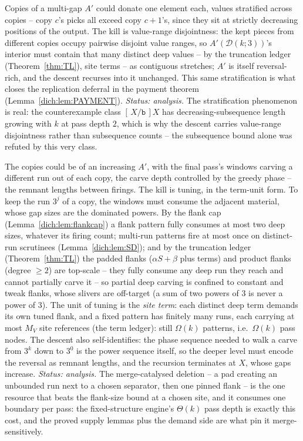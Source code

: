 \documentclass[runningheads,envcountsect]{llncs}
\begin{document}
\begin{proposition}
    \label{dich:escapeA}
    Copies of a multi-gap $A'$ could donate one element each, values stratified across copies -- copy $c$'s picks all exceed copy $c{+}1$'s, since they sit at strictly decreasing positions of the output. The kill is value-range disjointness: the kept pieces from different copies occupy pairwise disjoint value ranges, so $A'(\mathcal D(k;3))$'s interior must contain that many distinct deep values -- by the truncation ledger (Theorem~\ref{thm:TL}), site terms -- as contiguous stretches; $A'$ is itself reversal-rich, and the descent recurses into it unchanged. This same stratification is what closes the replication deferral in the payment theorem (Lemma~\ref{dich:lem:PAYMENT}). \emph{Status: analysis.} The stratification phenomenon is real: the counterexample class $[\,X/\mathtt b\,]X$ has decreasing-subsequence length growing with $k$ at pass depth $2$, which is why the descent carries value-range disjointness rather than subsequence counts -- the subsequence bound alone was refuted by this very class.
\end{proposition}

\begin{proposition}
    \label{dich:escapeB}
    The copies could be of an increasing $A'$, with the final pass's windows carving a different run out of each copy, the carve depth controlled by the greedy phase -- the remnant lengths between firings. The kill is tuning, in the term-unit form. To keep the run $3^j$ of a copy, the windows must consume the adjacent material, whose gap sizes are the dominated powers. By the flank cap (Lemma~\ref{dich:lem:flankcap}) a flank pattern fully consumes at most two deep sizes, whatever its firing count; multi-run patterns fire at most once on distinct-run scrutinees (Lemma~\ref{dich:lem:SD}); and by the truncation ledger (Theorem~\ref{thm:TL}) the padded flanks ($\alpha S + \beta$ plus terms) and product flanks (degree $\ge 2$) are top-scale -- they fully consume any deep run they reach and cannot partially carve it -- so partial deep carving is confined to constant and tweak flanks, whose slivers are off-target (a sum of two powers of $3$ is never a power of $3$). The unit of tuning is the \emph{site term}: each distinct deep term demands its own tuned flank, and a fixed pattern has finitely many runs, each carrying at most $M_V$ site references (the term ledger): still $\Omega(k)$ patterns, i.e.\ $\Omega(k)$ pass nodes. The descent also self-identifies: the phase sequence needed to walk a carve from $3^k$ down to $3^0$ is the power sequence itself, so the deeper level must encode the reversal as remnant lengths, and the recursion terminates at $X$, whose gaps increase. \emph{Status: analysis.} The merge-catalysed deletion -- a pad creating an unbounded run next to a chosen separator, then one pinned flank -- is the one resource that beats the flank-size bound at a chosen site, and it consumes one boundary per pass: the fixed-structure engine's $\Theta(k)$ pass depth is exactly this cost, and the proved supply lemmas plus the demand side are what pin it merge-sensitively.
\end{proposition}
\end{document}
